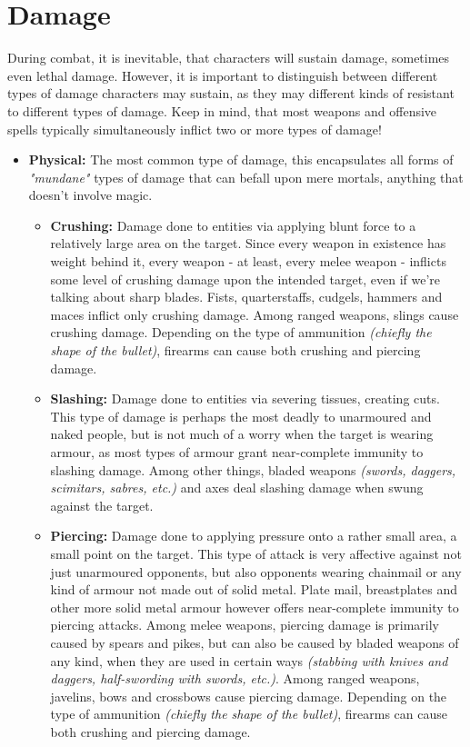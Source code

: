 \section{Damage}
During combat, it is inevitable, that characters will sustain damage, sometimes even lethal damage. However, it is important to distinguish between different types of damage characters may sustain, as they may different kinds of resistant to different types of damage. Keep in mind, that most weapons and offensive spells typically simultaneously inflict two or more types of damage!
\begin{itemize}
\item \textbf{Physical:} The most common type of damage, this encapsulates all forms of \textit{"mundane"} types of damage that can befall upon mere mortals, anything that doesn't involve magic.
	\begin{itemize}[label=$\star$]
		\item \textbf{Crushing:} Damage done to entities via applying blunt force to a relatively large area on the target. Since every weapon in existence has weight behind it, every weapon - at least, every melee weapon - inflicts some level of crushing damage upon the intended target, even if we're talking about sharp blades. Fists, quarterstaffs, cudgels, hammers and maces inflict only crushing damage. Among ranged weapons, slings cause crushing damage. Depending on the type of ammunition \textit{(chiefly the shape of the bullet)}, firearms can cause both crushing and piercing damage.
		\item \textbf{Slashing:} Damage done to entities via severing tissues, creating cuts. This type of damage is perhaps the most deadly to unarmoured and naked people, but is not much of a worry when the target is wearing armour, as most types of armour grant near-complete immunity to slashing damage. Among other things, bladed weapons \textit{(swords, daggers, scimitars, sabres, etc.)} and axes deal slashing damage when swung against the target.
		\item \textbf{Piercing:} Damage done to applying pressure onto a rather small area, a small point on the target. This type of attack is very affective against not just unarmoured opponents, but also opponents wearing chainmail or any kind of armour not made out of solid metal. Plate mail, breastplates and other more solid metal armour however offers near-complete immunity to piercing attacks. Among melee weapons, piercing damage is primarily caused by spears and pikes, but can also be caused by bladed weapons of any kind, when they are used in certain ways \textit{(stabbing with knives and daggers, half-swording with swords, etc.)}. Among ranged weapons, javelins, bows and crossbows cause piercing damage.  Depending on the type of ammunition \textit{(chiefly the shape of the bullet)}, firearms can cause both crushing and piercing damage.

\end{itemize}
\end{itemize}
